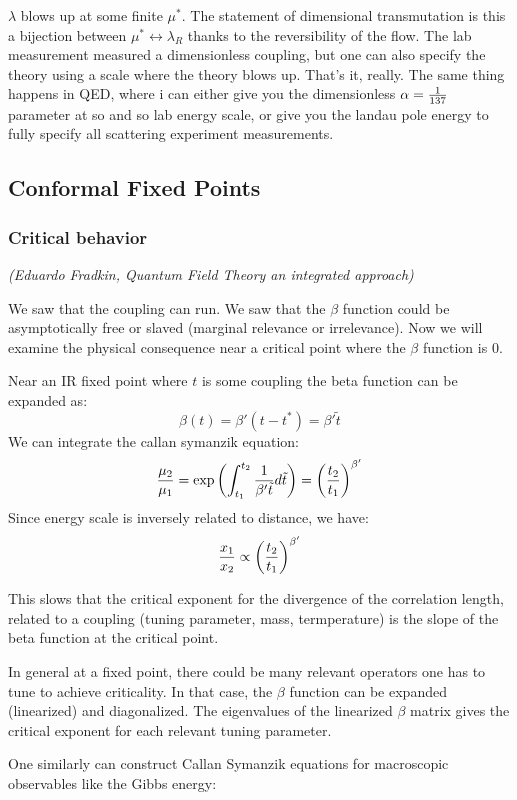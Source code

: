 \documentclass[11pt]{scrartcl}
\begin{document}
$\lambda$ blows up at some finite $\mu^*$.  The statement of dimensional transmutation is this a bijection between $\mu^* \leftrightarrow \lambda_R$ thanks to the reversibility of the flow.  The lab measurement measured a dimensionless coupling, but one can also specify the theory using a scale where the theory blows up.  That's it, really.  The same thing happens in QED, where i can either give you the dimensionless $\alpha = {1 \over 137}$ parameter at so and so lab energy scale, or give you the landau pole energy to fully specify all scattering experiment measurements.

\subsection{Conformal Fixed Points}
\subsubsection{Critical behavior}
\emph{(Eduardo Fradkin, Quantum Field Theory an integrated approach)}

We saw that the coupling can run.  We saw that the $\beta$ function could be asymptotically free or slaved (marginal relevance or irrelevance).  Now we will examine the physical consequence near a critical point where the $\beta$ function is 0.

Near an IR fixed point where $t$ is some coupling the beta function can be expanded as:
$$\beta(t) = \beta' (t - t^*) = \beta' \tilde{t}$$
We can integrate the callan symanzik equation:
$$ {\mu_2 \over \mu_1} = \exp  \left(\int_{t_1}^{t_2} {1 \over \beta' \tilde{t} } d \tilde{t} \right) = \left( {t_2 \over t_1} \right)^{\beta'}$$
Since energy scale is inversely related to distance, we have:
$$ {x_1 \over x_2} \propto  \left( {t_2 \over t_1} \right)^{\beta'}$$

This slows that the critical exponent for the divergence of the correlation length, related to a coupling (tuning parameter, mass, termperature) is the slope of the beta function at the critical point.

 In general at a fixed point, there could be many relevant operators one has to tune to achieve criticality.
 In that case, the $\beta$ function can be expanded (linearized) and diagonalized.  The eigenvalues of the linearized $\beta$ matrix gives the critical exponent for each relevant tuning parameter.
 
 One similarly can construct Callan Symanzik equations for macroscopic observables like the Gibbs energy:
  
\end{document}
